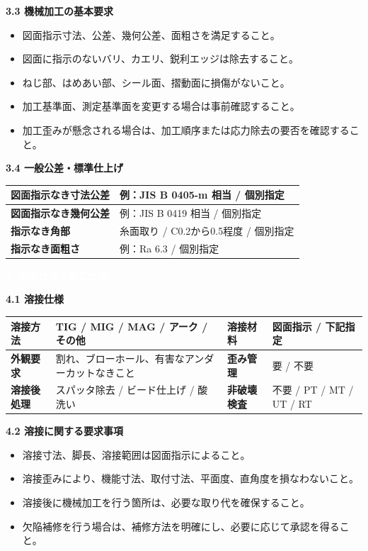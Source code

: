 \documentclass[a4paper,10pt]{ltjsarticle}
\makeatletter
\newlength{\SpecBodyWidth}
\newcommand{\PageTitle}[1]{%
  \vspace*{2mm}%
  \noindent\colorbox{SpecHead}{%
    \parbox{\dimexpr\SpecBodyWidth-2\fboxsep\relax}{%
      \large\bfseries\textcolor{white}{#1}%
    }%
  }%
  \par\vspace{5mm}%
}
\newcommand{\BlockTitle}[1]{%
  \vspace{4mm}%
  \noindent\colorbox{SpecSoft}{%
    \parbox{\dimexpr\SpecBodyWidth-2\fboxsep\relax}{%
      \normalsize\bfseries\textcolor{SpecHead}{#1}%
    }%
  }%
  \par\vspace{1.5mm}%
}
\newenvironment{SpecTable}[1]{%
  \par\vspace{1mm}%
  \noindent\footnotesize%
  \renewcommand{\arraystretch}{1.10}%
  \setlength{\tabcolsep}{3.0pt}%
  \begin{tabular*}{\SpecBodyWidth}{@{\extracolsep{\fill}}#1@{}}%
}{%
  \end{tabular*}%
  \par\vspace{1.5mm}%
}
\newcommand{\Lab}[1]{\textbf{\textcolor{SpecHead}{#1}}}
\newcommand{\YN}{要 / 不要}
\makeatother
\begin{document}
\BlockTitle{3.3 機械加工の基本要求}
\begin{itemize}
  \item 図面指示寸法、公差、幾何公差、面粗さを満足すること。
  \item 図面に指示のないバリ、カエリ、鋭利エッジは除去すること。
  \item ねじ部、はめあい部、シール面、摺動面に損傷がないこと。
  \item 加工基準面、測定基準面を変更する場合は事前確認すること。
  \item 加工歪みが懸念される場合は、加工順序または応力除去の要否を確認すること。
\end{itemize}

\BlockTitle{3.4 一般公差・標準仕上げ}
\begin{SpecTable}{|p{42mm}|p{104mm}|}
\hline
\Lab{図面指示なき寸法公差} & 例：JIS B 0405-m 相当 / 個別指定 \\
\hline
\Lab{図面指示なき幾何公差} & 例：JIS B 0419 相当 / 個別指定 \\
\hline
\Lab{指示なき角部} & 糸面取り / C0.2から0.5程度 / 個別指定 \\
\hline
\Lab{指示なき面粗さ} & 例：Ra 6.3 / 個別指定 \\
\hline
\end{SpecTable}

\clearpage

\PageTitle{4. 溶接仕様・組立仕様}

\BlockTitle{4.1 溶接仕様}
\begin{SpecTable}{|p{28mm}|p{43mm}|p{30mm}|p{43mm}|}
\hline
\Lab{溶接方法} & TIG / MIG / MAG / アーク / その他 & \Lab{溶接材料} & 図面指示 / 下記指定 \\
\hline
\Lab{外観要求} & 割れ、ブローホール、有害なアンダーカットなきこと & \Lab{歪み管理} & \YN \\
\hline
\Lab{溶接後処理} & スパッタ除去 / ビード仕上げ / 酸洗い & \Lab{非破壊検査} & 不要 / PT / MT / UT / RT \\
\hline
\end{SpecTable}

\BlockTitle{4.2 溶接に関する要求事項}
\begin{itemize}
  \item 溶接寸法、脚長、溶接範囲は図面指示によること。
  \item 溶接歪みにより、機能寸法、取付寸法、平面度、直角度を損なわないこと。
  \item 溶接後に機械加工を行う箇所は、必要な取り代を確保すること。
  \item 欠陥補修を行う場合は、補修方法を明確にし、必要に応じて承認を得ること。
\end{itemize}
\end{document}
